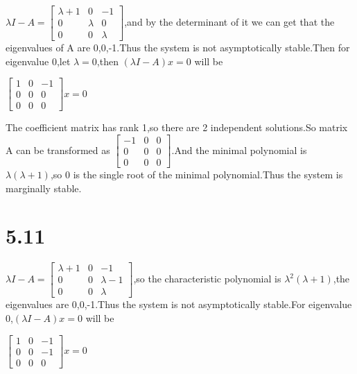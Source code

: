 \documentclass{article}
\begin{document}
$\lambda I-A=\left[\begin{array}{lll}\lambda+1 & 0 & -1\\0 & \lambda & 0\\0 & 0 &\lambda\end{array}\right]$,and by the determinant of it we can get that the eigenvalues of A are 0,0,-1.Thus the system is not asymptotically stable.Then for eigenvalue 0,let $\lambda=0$,then $(\lambda I-A)x=0$ will be\\
\begin{center}
    $\left[\begin{array}{lll}1 & 0 & -1\\0 & 0 & 0\\0 & 0 & 0\end{array}\right]x=0$
\end{center}

The coefficient matrix has rank 1,so there are 2 independent solutions.So matrix A can be transformed as $\left[\begin{array}{lll}-1 & 0 & 0\\0 & 0 & 0 \\0 & 0 & 0\end{array}\right]$.And the minimal polynomial is $\lambda(\lambda+1)$,so 0 is the single root of the minimal polynomial.Thus the system is marginally stable.\\

\section*{5.11}

$\lambda I-A=\left[\begin{array}{lll}\lambda +1 & 0 & -1\\0 & 0 & \lambda-1\\0 & 0 & \lambda\end{array}\right]$,so the characteristic polynomial is $\lambda^2(\lambda+1)$,the eigenvalues are 0,0,-1.Thus the system is not asymptotically stable.For eigenvalue 0,$(\lambda I-A)x=0$ will be \\
\begin{center}
    $\left[\begin{array}{lll}1 & 0 & -1\\0 & 0 & -1\\0 & 0 & 0\end{array}\right]x=0$
\end{center}
\end{document}
